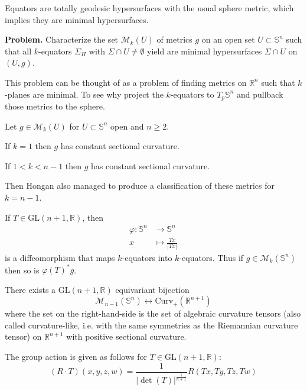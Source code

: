 \begin{remark}
\label{remark-equat-total-geode-usual-metr}
Equators are totally geodesic hypersurfaces
with the usual sphere metric, which
implies they are minimal hypersurfaces.
\end{remark}

{\bf Problem.} Characterize the set
$\mathcal{M}_k(U)$ of metrics $g$ on an
open set $U\subset\mathbb{S}^n$ such that all
$k$-equators $\Sigma_\Pi$ with
 $\Sigma\cap U\neq\emptyset$ yield are
 minimal hypersurfaces $\Sigma\cap U$
on $(U,g)$.

\begin{remark}
\label{remark-why-not-Rn}
This problem can be thought of as a problem
of finding metrics on $\mathbb{R}^n$
such that $k$-planes are minimal. To see why
project the $k$-equators to
$T_p\mathbb{S}^n$ and pullback those metrics
to the sphere.
\end{remark}

\medskip\noindent

Let $g\in\mathcal{M}_k(U)$ for
$U\subset\mathbb{S}^n$ open and $n\geq 2$.

\begin{theorem}
\label{theorem-Beltrami-Schafli}
If $k=1$ then $g$ has constant sectional
curvature.
\end{theorem}

\begin{theorem}[Hongan]
\label{theorem-Hongan}
If $1<k<n-1$ then $g$ has constant sectional
curvature.
\end{theorem}

Then Hongan also managed to produce a
classification of these metrics for
$k=n-1$.

\begin{remark}
\label{remark-linea-inver-prese-equat-mg}
If $T\in \text{GL}(n+1,\mathbb{R})$, then
$$
\begin{aligned}
\varphi: \mathbb{S}^n &\longrightarrow
\mathbb{S}^n \\
x &\longmapsto \frac{Tx}{|Tx|}
\end{aligned}
$$
is a diffeomorphism that maps $k$-equators
into $k$-equators. Thus if
$g\in\mathcal{M}_k(\mathbb{S}^n)$ then so is
$\varphi(T)^*g$.
\end{remark}

\begin{theorem}
\label{theorem-equivariant-bijection}
There exists a $\text{GL}(n+1,\mathbb{R})$
equivariant bijection
$$
\mathcal{M}_{n-1}(\mathbb{S}^n)
\leftrightarrow
\text{Curv}_+(\mathbb{R}^{n+1})
$$
where the set on the right-hand-side is the
set of algebraic curvature tensors
(also called curvature-like, i.e. with the
same symmetries as the Riemannian
curvature tensor) on $\mathbb{R}^{n+1}$ with
positive sectional curvature.

The group action is given as follows for
$T\in\text{GL}(n+1,\mathbb{R})$:
$$
(R\cdot
T)(x,y,z,w)=\frac{1}{|\det(T)|^{\frac{1}{n+1}
}}R(Tx,Ty,Tz,Tw)
$$
\end{theorem}

